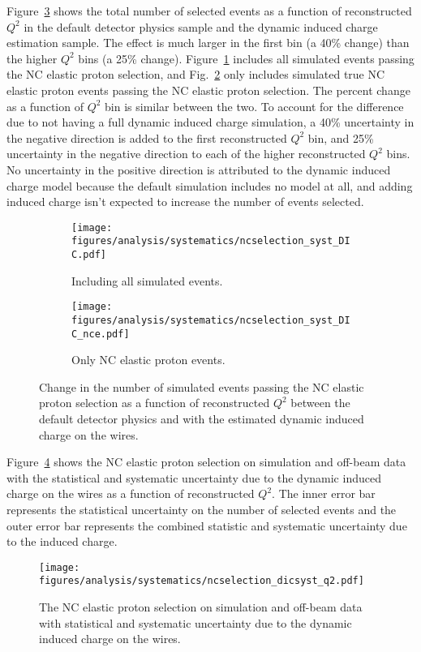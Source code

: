     Figure~\ref{fig:dicchange} shows the total number of selected events as a
    function of reconstructed $Q^2$ in the default detector physics sample and
    the dynamic induced charge estimation sample. The effect is much larger in
    the first bin (a 40\% change) than the higher $Q^2$ bins (a 25\% change).
    Figure~\ref{fig:dicchangeall} includes all simulated events passing the NC
    elastic proton selection, and Fig.~\ref{fig:dicchangence} only includes
    simulated true NC elastic proton events passing the NC elastic proton
    selection. The percent change as a function of $Q^2$ bin is similar between
    the two. To account for the difference due to not having a full dynamic
    induced charge simulation, a 40\% uncertainty in the negative direction is
    added to the first reconstructed $Q^2$ bin, and 25\% uncertainty in the
    negative direction to each of the higher reconstructed $Q^2$ bins. No
    uncertainty in the positive direction is attributed to the dynamic induced
    charge model because the default simulation includes no model at all, and
    adding induced charge isn't expected to increase the number of events
    selected.
    \begin{figure}[h]
      \centering
      \begin{subfigure}[t]{2.8in}
        \texttt{[image: figures/analysis/systematics/ncselection\_syst\_DIC.pdf]}
        \caption{Including all simulated events.}
        \label{fig:dicchangeall}
      \end{subfigure}
      \hspace{2pt}
      \begin{subfigure}[t]{2.8in}
        \texttt{[image: figures/analysis/systematics/ncselection\_syst\_DIC\_nce.pdf]}
        \caption{Only NC elastic proton events.}
        \label{fig:dicchangence}
      \end{subfigure}
      \caption{Change in the number of simulated events passing the NC elastic
      proton selection as a function of reconstructed $Q^2$ between the default
      detector physics and with the estimated dynamic induced charge on the
      wires.}
      \label{fig:dicchange}
    \end{figure}
    
    Figure~\ref{fig:systdic} shows the NC elastic proton selection on
    simulation and off-beam data with the statistical and systematic
    uncertainty due to the dynamic induced charge on the wires as a function of
    reconstructed $Q^2$. The inner error bar represents the statistical
    uncertainty on the number of selected events and the outer error bar
    represents the combined statistic and systematic uncertainty due to the
    induced charge.
    \begin{figure}[ht]
      \centering
      \texttt{[image: figures/analysis/systematics/ncselection\_dicsyst\_q2.pdf]}
      \caption{The NC elastic proton selection on simulation and off-beam data
      with statistical and systematic uncertainty due to the dynamic induced
      charge on the wires.}
      \label{fig:systdic}
    \end{figure}

